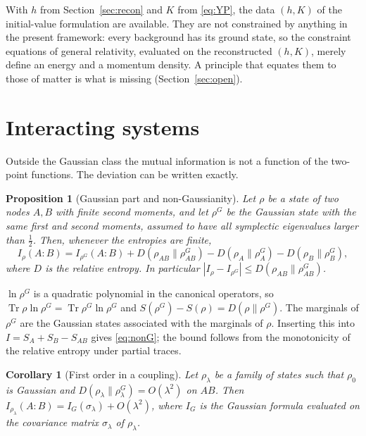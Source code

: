 \documentclass[11pt,a4paper]{article}
\makeatletter
\theoremstyle{stmt}
\newtheorem{proposition}[theorem]{Proposition}
\newtheorem{corollary}[theorem]{Corollary}
\theoremstyle{defn}
\theoremstyle{rmk}
\renewenvironment{proof}[1][\proofname]{\par\pushQED{\qed}\normalfont\topsep6\p@\@plus6\p@\relax
  \trivlist\item[\hskip\labelsep{\sffamily\itshape\small #1.}]\ignorespaces}{\popQED\endtrivlist\@endpefalse}
\numberwithin{equation}{section}
\DeclareMathOperator{\Tr}{Tr}
\makeatother
\begin{document}
With $h$ from Section~\ref{sec:recon} and $K$ from \eqref{eq:YP}, the data $(h,K)$ of the initial-value formulation are available. They are not constrained by anything in the present framework: every background has its ground state, so the constraint equations of general relativity, evaluated on the reconstructed $(h,K)$, merely define an energy and a momentum density. A principle that equates them to those of matter is what is missing (Section~\ref{sec:open}).

\section{Interacting systems}\label{sec:int}

Outside the Gaussian class the mutual information is not a function of the two-point functions. The deviation can be written exactly.

\begin{proposition}[Gaussian part and non-Gaussianity]\label{prop:nonG}
Let $\rho$ be a state of two nodes $A,B$ with finite second moments, and let $\rho^G$ be the Gaussian state with the same first and second moments, assumed to have all symplectic eigenvalues larger than $\tfrac12$. Then, whenever the entropies are finite,
\begin{equation}\label{eq:nonG}
I_\rho(A:B)=I_{\rho^G}(A:B)+D(\rho_{AB}\|\rho^G_{AB})-D(\rho_A\|\rho^G_A)-D(\rho_B\|\rho^G_B),
\end{equation}
where $D$ is the relative entropy. In particular $|I_\rho-I_{\rho^G}|\le D(\rho_{AB}\|\rho^G_{AB})$.
\end{proposition}

\begin{proof}
$\ln\rho^G$ is a quadratic polynomial in the canonical operators, so $\Tr\rho\ln\rho^G=\Tr\rho^G\ln\rho^G$ and $S(\rho^G)-S(\rho)=D(\rho\|\rho^G)$. The marginals of $\rho^G$ are the Gaussian states associated with the marginals of $\rho$. Inserting this into $I=S_A+S_B-S_{AB}$ gives \eqref{eq:nonG}; the bound follows from the monotonicity of the relative entropy under partial traces.
\end{proof}

\begin{corollary}[First order in a coupling]\label{cor:firstorder}
Let $\rho_\lambda$ be a family of states such that $\rho_0$ is Gaussian and $D(\rho_{\lambda}\|\rho^G_{\lambda})=O(\lambda^2)$ on $AB$. Then $I_{\rho_\lambda}(A:B)=I_G(\sigma_\lambda)+O(\lambda^2)$, where $I_G$ is the Gaussian formula evaluated on the covariance matrix $\sigma_\lambda$ of $\rho_\lambda$.
\end{corollary}
\end{document}
